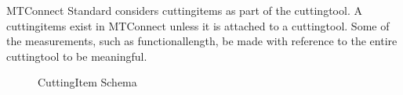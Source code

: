 MTConnect Standard considers \glspl{cuttingitem} as part of the \gls{cuttingtool}.  A \glspl{cuttingitem} \MUSTNOT exist in MTConnect unless it is attached to a \gls{cuttingtool}.  Some of the measurements, such as \gls{functionallength}, \MUST be made with reference to the entire \gls{cuttingtool} to be meaningful.  

\begin{figure}[ht]
  \centering
  \caption{CuttingItem Schema}
  \label{fig:cuttingitem-schema}
\end{figure}

